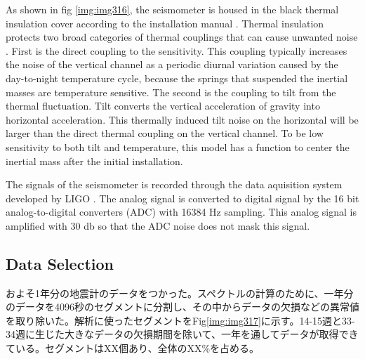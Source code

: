 As shown in fig \ref{img:img316}, the seismometer is housed in the black thermal insulation cover according to the installation manual \cite{trillium120manual}. Thermal insulation protects two broad categories of thermal couplings that can cause unwanted noise \cite{trillium120manual}. First is the direct coupling to the sensitivity. This coupling typically increases the noise of the vertical channel as a periodic diurnal variation caused by the day-to-night temperature cycle, because the springs that suspended the inertial masses are temperature sensitive. The second is the coupling to tilt from the thermal fluctuation. Tilt converts the vertical acceleration of gravity into horizontal acceleration. This thermally induced tilt noise on the horizontal will be larger than the direct thermal coupling on the vertical channel. To be low sensitivity to both tilt and temperature, this model has a function to center the inertial mass after the initial installation.

The signals of the seismometer is recorded through the data aquisition system developed by LIGO \cite{bork2001overview}. The analog signal is converted to digital signal by the 16 bit analog-to-digital converters (ADC) with 16384 $\mathrm{Hz}$ sampling. This analog signal is amplified with 30 db so that the ADC noise does not mask this signal. 



\subsection{Data Selection}
およそ1年分の地震計のデータをつかった。スペクトルの計算のために、一年分のデータを4096秒のセグメントに分割し、その中からデータの欠損などの異常値を取り除いた。解析に使ったセグメントをFig\ref{img:img317}に示す。14-15週と33-34週に生じた大きなデータの欠損期間を除いて、一年を通してデータが取得できている。セグメントはXX個あり、全体のXX\%を占める。

